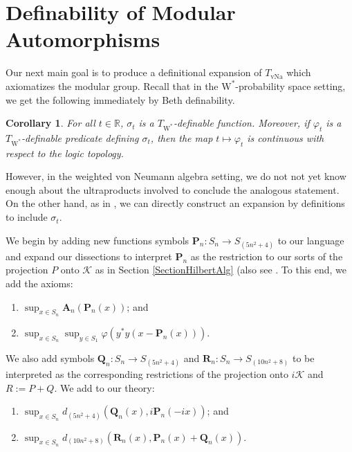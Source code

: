 \documentclass[12pt]{amsart}
\newtheorem{cor}[thm]{Corollary}
\theoremstyle{definition}
\def\vp{\varphi}
\def\cal{\mathcal}
\newcommand{\wstar}{$\mathrm{W}^*$}
\DeclareMathOperator{\vNa}{vNa}
\def \vP{\mathbf{P}}
\def \vQ{\mathbf{Q}}
\def \vR{\mathbf{R}}
\def \vA{\mathbf{A}}
\def \bbR{\mathbb{R}}
\begin{document}
\section{Definability of Modular Automorphisms}\label{SectionDefModular}

Our next main goal is to produce a definitional expansion of $T_{\vNa}$ which axiomatizes the modular group.  Recall that in the \wstar-probability space setting, we get the following immediately by Beth definability.

\begin{cor}{\cite[Corollary 7.2]{AGHS}} \label{AGHSMod}
    For all $t\in \bbR$, $\sigma_t$ is a $T_{\text{\wstar}}$-definable function.  Moreover, if $\vp_t$ is a $T_{\text{\wstar}}$-definable predicate defining $\sigma_t$, then the map $t\mapsto \vp_t$ is continuous with respect to the logic topology.
\end{cor}

However, in the weighted von Neumann algebra setting, we do not not yet know enough about the ultraproducts involved to conclude the analogous statement.  On the other hand, as in \cite{AGHS}, we can directly construct an expansion by definitions to include $\sigma_t$.

We begin by adding new functions symbols $\vP_n:S_n\to S_{(5n^2+4)}$ to our language and expand our dissections to interpret $\vP_n$ as the restriction to our sorts of the projection $P$ onto $\cal K$ as in Section \ref{SectionHilbertAlg} (also see \cite[Section 5]{RvD}.  To this end, we add the axioms:

\begin{enumerate}
    \item[(11)] $\sup_{x\in S_n} \vA_n(\vP_n(x))$; and
    \item[(12)] $\sup_{x\in S_n}\sup_{y\in S_1} \vp(y^*y(x-\vP_n(x)))$.
\end{enumerate}

We also add symbols $\vQ_n:S_n\to S_{(5n^2+4)}$ and $\vR_n:S_n\to S_{(10n^2+8)}$ to be interpreted as the corresponding restrictions of the projection onto $i\cal K$ and $R := P + Q$.  We add to our theory:

\begin{enumerate}
    \item[(13)] $\sup_{x\in S_n}d_{(5n^2+4)}(\vQ_n(x),i\vP_n(-ix))$; and
    \item[(14)] $\sup_{x\in S_n}d_{(10n^2+8)}(\vR_n(x),\vP_n(x)+\vQ_n(x))$.
\end{enumerate}
\end{document}
